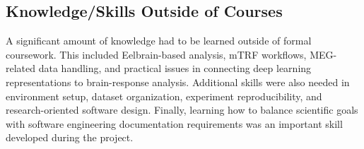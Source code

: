 \documentclass{article}
\begin{document}
\subsection{Knowledge/Skills Outside of Courses}


A significant amount of knowledge had to be learned outside of formal coursework.
This included Eelbrain-based analysis, mTRF workflows, MEG-related data handling, and practical issues in connecting deep learning representations to brain-response analysis.
Additional skills were also needed in environment setup, dataset organization, experiment reproducibility, and research-oriented software design.
Finally, learning how to balance scientific goals with software engineering documentation requirements was an important skill developed during the project.
\end{document}
